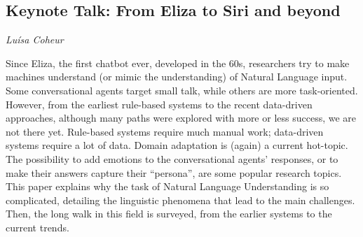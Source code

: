 \documentclass[../booklet.tex]{subfiles}
\begin{document}
\subsection[Keynote Talk: From Eliza to Siri and beyond. {\it Luísa Coheur}]{Keynote Talk: From Eliza to Siri and beyond}

\begin{center}
  {\it Luísa Coheur}
\end{center}


Since Eliza, the first chatbot ever, developed in the 60s, researchers
try to make machines understand (or mimic the understanding) of
Natural Language input. Some conversational agents target small talk,
while others are more task-oriented. However, from the earliest
rule-based systems to the recent data-driven approaches, although many
paths were explored with more or less success, we are not there
yet. Rule-based systems require much manual work; data-driven systems
require a lot of data. Domain adaptation is (again) a current
hot-topic. The possibility to add emotions to the conversational
agents' responses, or to make their answers capture their ``persona'',
are some popular research topics.  This paper explains why the task of
Natural Language Understanding is so complicated, detailing the
linguistic phenomena that lead to the main challenges. Then, the long
walk in this field is surveyed, from the earlier systems to the
current trends.
\end{document}
